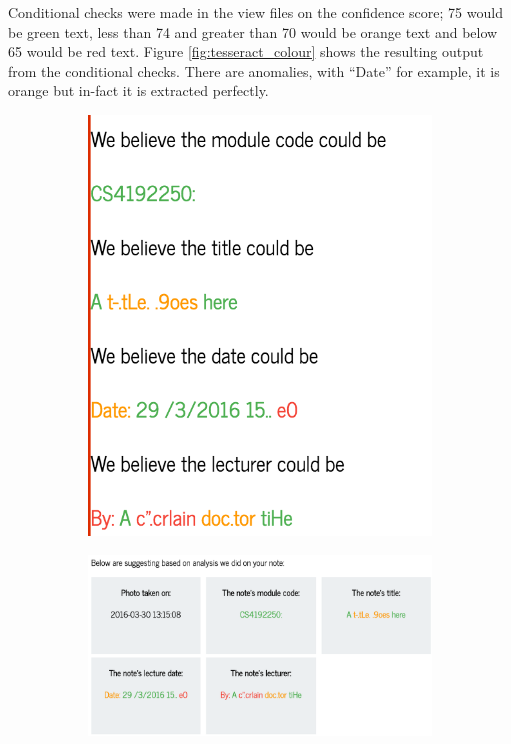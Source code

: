 {{{{{{{Conditional checks were made in the view files on the confidence score; 75 would be green text, less than 74 and greater than 70 would be orange text and below 65 would be red text. Figure \ref{fig:tesseract_colour} shows the resulting output from the conditional checks. There are anomalies, with ``Date'' for example, it is orange but in-fact it is extracted perfectly.
\begin{figure}[H]
  \centering
  \begin{subfigure}[h]{0.35\textwidth}
    \includegraphics[scale=0.35]{images/tesseract_colour}
    \caption{}
    \label{fig:first_tesseract}
  \end{subfigure}
  \hspace{1em}
  \begin{subfigure}[h]{0.35\textwidth}
    \includegraphics[scale=0.3]{images/styled-tesseract-data}

\end{subfigure}
\end{figure}}}}}}}}
